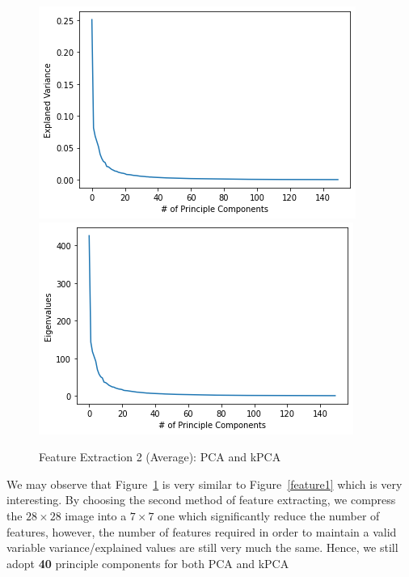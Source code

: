 \documentclass{article}
\begin{document}
\begin{figure}[!htb]
  \includegraphics[width=\linewidth]{figure/pca_avg.png}
\endminipage\hfill
{}
  \includegraphics[width=\linewidth]{figure/kpca_avg.png}
\endminipage
\caption{Feature Extraction 2 (Average): PCA and kPCA}
\label{feature2}
\end{figure}

We may observe that Figure~\ref{feature2} is very similar to Figure~\ref{feature1} which is very interesting. By choosing the second method of feature extracting, we compress the $28\times 28$ image into a $7 \times 7$ one which significantly reduce the number of features, however, the number of features required in order to maintain a valid variable variance/explained values are still very much the same. Hence, we still adopt \textbf{40} principle components for both PCA and kPCA
\end{document}
